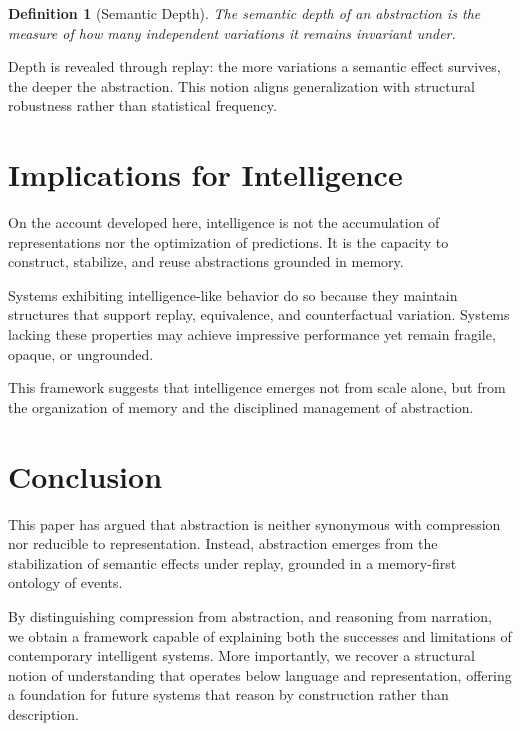 \documentclass[11pt]{article}
\newtheorem{definition}{Definition}[section]
\begin{document}
\begin{definition}[Semantic Depth]
The semantic depth of an abstraction is the measure of how many independent variations it remains invariant under.
\end{definition}

Depth is revealed through replay: the more variations a semantic effect survives, the deeper the abstraction. This notion aligns generalization with structural robustness rather than statistical frequency.

\section{Implications for Intelligence}

On the account developed here, intelligence is not the accumulation of representations nor the optimization of predictions. It is the capacity to construct, stabilize, and reuse abstractions grounded in memory.

Systems exhibiting intelligence-like behavior do so because they maintain structures that support replay, equivalence, and counterfactual variation. Systems lacking these properties may achieve impressive performance yet remain fragile, opaque, or ungrounded.

This framework suggests that intelligence emerges not from scale alone, but from the organization of memory and the disciplined management of abstraction.

\section{Conclusion}

This paper has argued that abstraction is neither synonymous with compression nor reducible to representation. Instead, abstraction emerges from the stabilization of semantic effects under replay, grounded in a memory-first ontology of events.

By distinguishing compression from abstraction, and reasoning from narration, we obtain a framework capable of explaining both the successes and limitations of contemporary intelligent systems. More importantly, we recover a structural notion of understanding that operates below language and representation, offering a foundation for future systems that reason by construction rather than description.
\end{document}
